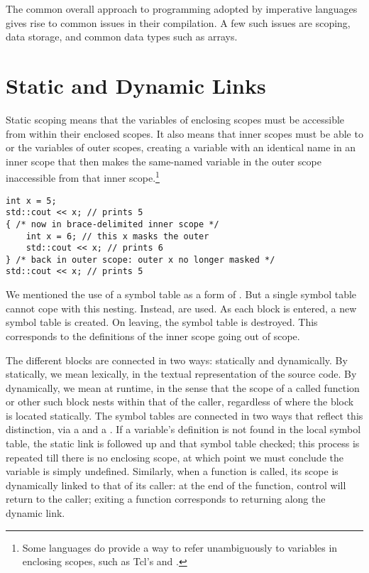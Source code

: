 \label{imperative:compiling}
The common overall approach to programming adopted by imperative languages gives rise to common issues in their compilation. A few such issues are scoping, data storage, and common data types such as arrays.

\section{Static and Dynamic Links}
Static scoping means that the variables of enclosing scopes must be accessible from within their enclosed scopes. It also means that inner scopes must be able to  or  the variables of outer scopes, creating a variable with an identical name in an inner scope that then makes the same-named variable in the outer scope inaccessible from that inner scope.\footnote{Some languages do provide a way to refer unambiguously to variables in enclosing scopes, such as Tcl's  and .}
\begin{lstlisting}[float, caption=Scopes and shadowing]
int x = 5;
std::cout << x; // prints 5
{ /* now in brace-delimited inner scope */
    int x = 6; // this x masks the outer
    std::cout << x; // prints 6
} /* back in outer scope: outer x no longer masked */
std::cout << x; // prints 5
\end{lstlisting}

We mentioned the use of a symbol table as a form of \IR{}. But a single symbol table cannot cope with this nesting. Instead,  are used. As each block is entered, a new symbol table is created. On leaving, the symbol table is destroyed. This corresponds to the definitions of the inner scope going out of scope.

The different blocks are connected in two ways: statically and dynamically. By statically, we mean lexically, in the textual representation of the source code. By dynamically, we mean at runtime, in the sense that the scope of a called function or other such block nests within that of the caller, regardless of where the block is located statically. The symbol tables are connected in two ways that reflect this distinction, via a  and a . If a variable's definition is not found in the local symbol table, the static link is followed up and that symbol table checked; this process is repeated till there is no enclosing scope, at which point we must conclude the variable is simply undefined. Similarly, when a function is called, its scope is dynamically linked to that of its caller: at the end of the function, control will return to the caller; exiting a function corresponds to returning along the dynamic link.

